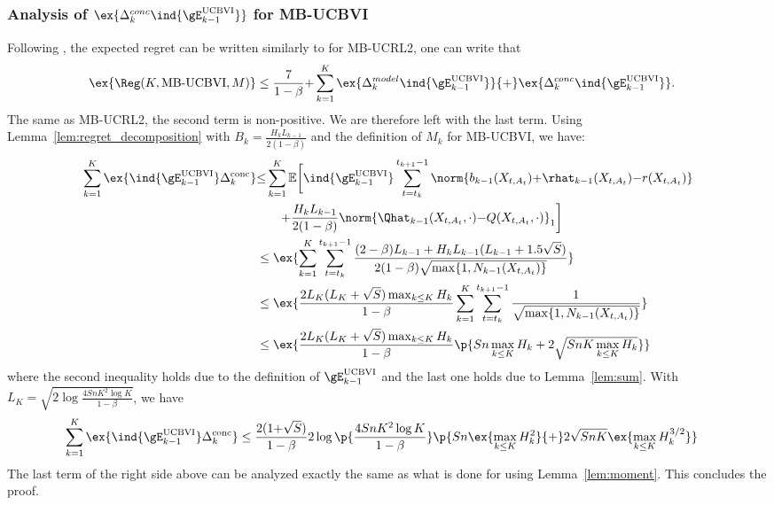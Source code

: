 \begin{subappendices}
\subsubsection{Analysis of $\ex{\Delta^{conc}_k\ind{\gE^\text{UCBVI}_{k-1}}}$ for MB-UCBVI}
Following , the expected regret can be written similarly to  for MB-UCRL2, one can write that
\begin{align*}
    \ex{\Reg(K,\text{MB-UCBVI},M)}
    &\le \frac{7}{1-\beta} {+} \sum_{k=1}^{K} \ex{\Delta^{model}_k\ind{\gE^\text{UCBVI}_{k-1}}} {+} \ex{\Delta^{conc}_k\ind{\gE^\text{UCBVI}_{k-1}}}.
\end{align*}
The same as MB-UCRL2, the second term is non-positive.
We are therefore left with the last term.
Using Lemma~\ref{lem:regret_decomposition} with $B_k=\frac{H_kL_{k-1}}{2(1-\beta)}$ and the definition of $M_k$ for MB-UCBVI, we have:
\begin{align*}
    \sum_{k=1}^K \ex{ \ind{\gE_{k{-}1}^\text{UCBVI}} \Delta_k^\text{conc}} &{\le} \sum_{k=1}^K \mathbb{E}\bigg[ \ind{\gE_{k{-}1}^\text{UCBVI}}\sum_{t=t_k}^{t_{k+1}-1} \norm{b_{k-1}(X_{t,A_t}) {+}\rhat_{k-1}(X_{t,A_t}){-}r(X_{t,A_t})} \\
    &\qquad {+}\frac{H_kL_{k-1}}{2(1-\beta)}\norm{\Qhat_{k-1}(X_{t,A_t},\cdot){-}Q(X_{t,A_t},\cdot)}_1 \bigg] \\
    &\le \ex{\sum_{k=1}^{K}\sum_{t=t_k}^{t_{k+1}-1} \frac{(2-\beta)L_{k-1}+H_kL_{k-1}(L_{k-1}+1.5\sqrt{S})}{2(1-\beta)\sqrt{\max\{1,N_{k-1}(X_{t,A_t})\} }}} \\
    &\le \ex{\frac{2L_K(L_K+\sqrt{S})\max_{k\le K}H_k}{1-\beta} \sum_{k=1}^{K} \sum_{t=t_k}^{t_{k+1}-1} \frac1{\sqrt{\max\{1,N_{k-1}(X_{t,A_t})\} }}} \\
    &\le \ex{\frac{2L_K(L_K+\sqrt{S})\max_{k\le K}H_k}{1-\beta} \p{Sn\max_{k\le K}H_k +2\sqrt{SnK\max_{k\le K}H_k} }} 
\end{align*}
where the second inequality holds due to the definition of $\gE_{k-1}^\text{UCBVI}$ and the last one holds due to Lemma~\ref{lem:sum}.
With $L_K{=}\sqrt{2\log\frac{4SnK^2\log K}{1-\beta}}$, we have
\begin{align*}
    \sum_{k=1}^K \ex{ \ind{\gE_{k{-}1}^\text{UCBVI}} \Delta_k^\text{conc}}
    &\le \frac{2(1{+}\sqrt{S})}{1-\beta} 2\log\p{\frac{4SnK^2\log K}{1-\beta}} \p{Sn\ex{\max_{k\le K}H_k^2} {+}2\sqrt{SnK} \ex{\max_{k\le K}H_k^{3/2}}}
\end{align*}
The last term of the right side above can be analyzed exactly the same as what is done for  using Lemma~\ref{lem:moment}.
This concludes the proof.


\end{subappendices}
